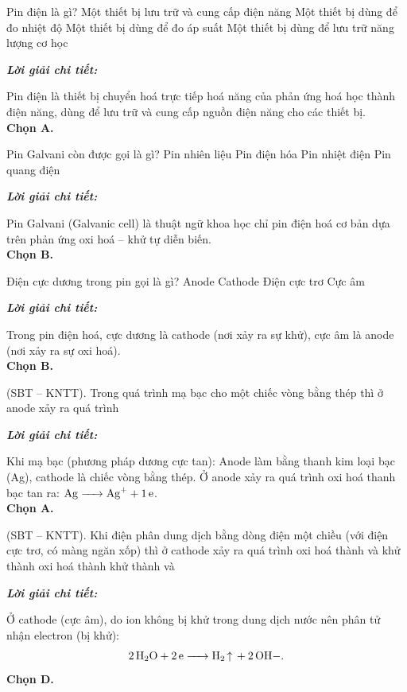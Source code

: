 \documentclass[11pt,a4paper]{article}
\def\loigiai#1{
\par\begingroup\color{blue!80!black}\small
\noindent\textbf{\textit{Lời giải chi tiết:}}\par
#1\par\endgroup}
\begin{document}
\begin{ex}
Pin điện là gì?
\choice
{\True Một thiết bị lưu trữ và cung cấp điện năng}
{Một thiết bị dùng để đo nhiệt độ}
{Một thiết bị dùng để đo áp suất}
{Một thiết bị dùng để lưu trữ năng lượng cơ học}
\loigiai{
Pin điện là thiết bị chuyển hoá trực tiếp hoá năng của phản ứng hoá học thành điện năng, dùng để lưu trữ và cung cấp nguồn điện năng cho các thiết bị.\\
\textbf{Chọn A.}}
\end{ex}

\begin{ex}
Pin Galvani còn được gọi là gì?
\choice
{Pin nhiên liệu}
{\True Pin điện hóa}
{Pin nhiệt điện}
{Pin quang điện}
\loigiai{
Pin Galvani (Galvanic cell) là thuật ngữ khoa học chỉ pin điện hoá cơ bản dựa trên phản ứng oxi hoá -- khử tự diễn biến.\\
\textbf{Chọn B.}}
\end{ex}

\begin{ex}
Điện cực dương trong pin gọi là gì?
\choice
{Anode}
{\True Cathode}
{Điện cực trơ}
{Cực âm}
\loigiai{
Trong pin điện hoá, cực dương là cathode (nơi xảy ra sự khử), cực âm là anode (nơi xảy ra sự oxi hoá).\\
\textbf{Chọn B.}}
\end{ex}

\begin{ex}
(SBT – KNTT). Trong quá trình mạ bạc cho một chiếc vòng bằng thép thì ở anode xảy ra quá trình
\choice
{\True {}}
{}
{}
{}
\loigiai{
Khi mạ bạc (phương pháp dương cực tan): Anode làm bằng thanh kim loại bạc (Ag), cathode là chiếc vòng bằng thép. Ở anode xảy ra quá trình oxi hoá thanh bạc tan ra: $\ce{Ag -> Ag+ + 1e}$.\\
\textbf{Chọn A.}}
\end{ex}

\begin{ex}
(SBT – KNTT). Khi điện phân dung dịch  bằng dòng điện một chiều (với điện cực trơ, có màng ngăn xốp) thì ở cathode xảy ra quá trình
\choice
{oxi hoá  thành  và }
{khử  thành }
{oxi hoá  thành }
{\True khử  thành  và }
\loigiai{
Ở cathode (cực âm), do ion  không bị khử trong dung dịch nước nên phân tử \ce{H2O} nhận electron (bị khử):
$$\ce{2H2O + 2e -> H2 ^ + 2OH-.}$$
\textbf{Chọn D.}}
\end{ex}
\end{document}
